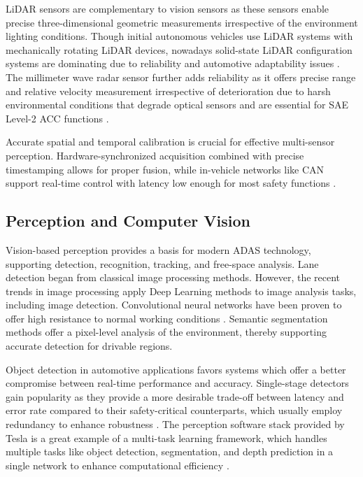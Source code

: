 \documentclass[12pt, a4paper]{report}
\begin{document}
\ac{LiDAR} sensors are complementary to vision sensors as these sensors enable precise three-dimensional geometric measurements irrespective of the environment lighting conditions. Though initial autonomous vehicles use \ac{LiDAR} systems with mechanically rotating \ac{LiDAR} devices, nowadays solid-state \ac{LiDAR} configuration systems are dominating due to reliability and automotive adaptability issues \cite{ref14}. The millimeter wave radar sensor further adds reliability as it offers precise range and relative velocity measurement irrespective of deterioration due to harsh environmental conditions that degrade optical sensors and are essential for \ac{SAE} Level-2 \ac{ACC} functions \cite{ref12}.

Accurate spatial and temporal calibration is crucial for effective multi-sensor perception. Hardware-synchronized acquisition combined with precise timestamping allows for proper fusion, while in-vehicle networks like CAN support real-time control with latency low enough for most safety functions \cite{ref13}.
\subsection{Perception and Computer Vision}

Vision-based perception provides a basis for modern \ac{ADAS} technology, supporting detection, recognition, tracking, and free-space analysis. Lane detection began from classical image processing methods. However, the recent trends in image processing apply Deep Learning methods to image analysis tasks, including image detection. Convolutional neural networks have been proven to offer high resistance to normal working conditions \cite{ref12}. Semantic segmentation methods offer a pixel-level analysis of the environment, thereby supporting accurate detection for drivable regions.

Object detection in automotive applications favors systems which offer a better compromise between real-time performance and accuracy. Single-stage detectors gain popularity as they provide a more desirable trade-off between latency and error rate compared to their safety-critical counterparts, which usually employ redundancy to enhance robustness \cite{ref12}. The perception software stack provided by Tesla is a great example of a multi-task learning framework, which handles multiple tasks like object detection, segmentation, and depth prediction in a single network to enhance computational efficiency \cite{ref11}.
\end{document}
